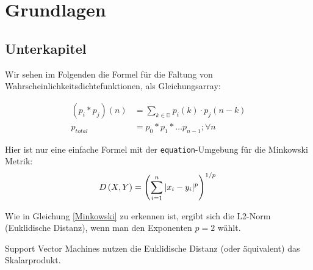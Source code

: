 \clearpage
\chapter{\textbf{Grundlagen}}\label{grundlagen}

\section{Unterkapitel}\label{unterkapitel}

Wir sehen im Folgenden die Formel für die Faltung von Wahrscheinlichkeitsdichtefunktionen, als Gleichungsarray:

\begin{align}
(p_i * p_j)(n) & =  \sum_{k \in \mathbb{D}} p_i(k) \cdot p_j(n - k) \\
p_{total} & =  p_0 \ast p_1 \ast \ldots p_{n-1}; \forall n
\end{align}

Hier ist nur eine einfache Formel mit der \texttt{equation}-Umgebung für die Minkowski Metrik:
\begin{equation}\label{Minkowski}
D\left(X,Y\right)=\left(\sum_{i=1}^n |x_i-y_i|^p\right)^{1/p}\\
\end{equation}

Wie in Gleichung \ref{Minkowski} zu erkennen ist, ergibt sich die L2-Norm (Euklidische Distanz), wenn man den Exponenten $p = 2$ wählt.

Support Vector Machines \cite{Haykin99} nutzen die Euklidische Distanz (oder äquivalent) das Skalarprodukt.

